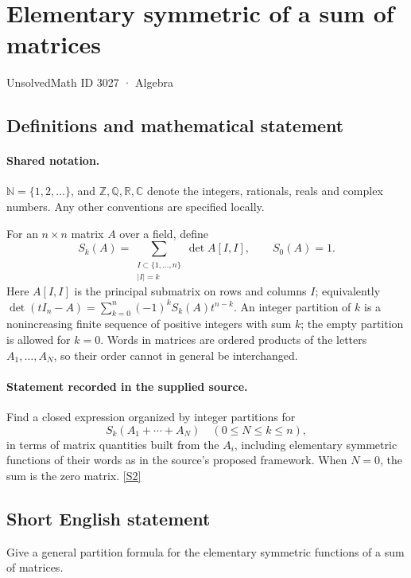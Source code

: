 \documentclass[11pt]{article}
\newcommand{\sref}[2]{\hyperlink{source:#1:#2}{[S#2]}}
\begin{document}
\setcounter{section}{3026}
\section{Elementary symmetric of a sum of matrices}\label{3027}
{\small\sffamily UnsolvedMath ID 3027 · Algebra}
\subsection{Definitions and mathematical statement}

\paragraph{Shared notation.}$\mathbb N=\{1,2,\ldots\}$, and $\mathbb Z,\mathbb Q,\mathbb R,\mathbb C$ denote the integers, rationals, reals and complex numbers. Any other conventions are specified locally.


For an $n\times n$ matrix $A$ over a field, define
\[
 S_k(A)=\sum_{\substack{I\subset\{1,\ldots,n\}\\|I|=k}}\det A[I,I],\qquad S_0(A)=1.
\]
Here $A[I,I]$ is the principal submatrix on rows and columns $I$; equivalently $\det(tI_n-A)=\sum_{k=0}^n(-1)^kS_k(A)t^{n-k}$. An integer partition of $k$ is a nonincreasing finite sequence of positive integers with sum $k$; the empty partition is allowed for $k=0$. Words in matrices are ordered products of the letters $A_1,\ldots,A_N$, so their order cannot in general be interchanged.
\paragraph{Statement recorded in the supplied source.}
Find a closed expression organized by integer partitions for
\[
 S_k(A_1+\cdots+A_N)
 \quad(0\leq N\leq k\leq n),
\]
in terms of matrix quantities built from the $A_i$, including elementary symmetric functions of their words as in the source's proposed framework. When $N=0$, the sum is the zero matrix. \sref{3027}{2}
\subsection{Short English statement}
Give a general partition formula for the elementary symmetric functions of a sum of matrices.
\end{document}
